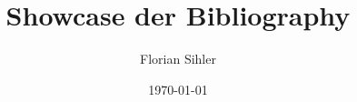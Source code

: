 \documentclass{article}
\title{Showcase der Bibliography}
\author{Florian Sihler}
\date{\today}
\begin{document}
\maketitle

\nocite{*}
\printbibliography
\end{document}
